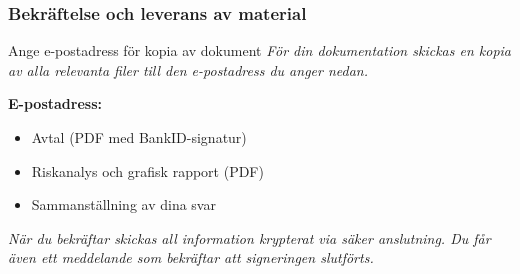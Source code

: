 \documentclass[10pt]{beamer}
\begin{document}
\begin{frame}[fragile]
  \frametitle{Bekräftelse och leverans av material}

  \begin{block}{Ange e-postadress för kopia av dokument}
    \vspace{0.2cm}
    \textit{För din dokumentation skickas en kopia av alla relevanta filer till den e-postadress du anger nedan.}
    \vspace{0.4cm}

    \textbf{E-postadress:} \underline{\hspace{6cm}}
    \vspace{0.5cm}

    \begin{itemize}
      \item Avtal (PDF med BankID-signatur)
      \item Riskanalys och grafisk rapport (PDF)
      \item Sammanställning av dina svar
    \end{itemize}
  \end{block}

  \vspace{0.5cm}
  \begin{center}
  \end{center}

  \vspace{0.6cm}
  \small
  \textit{När du bekräftar skickas all information krypterat via säker anslutning.  
  Du får även ett meddelande som bekräftar att signeringen slutförts.}

\end{frame}


\end{document}
